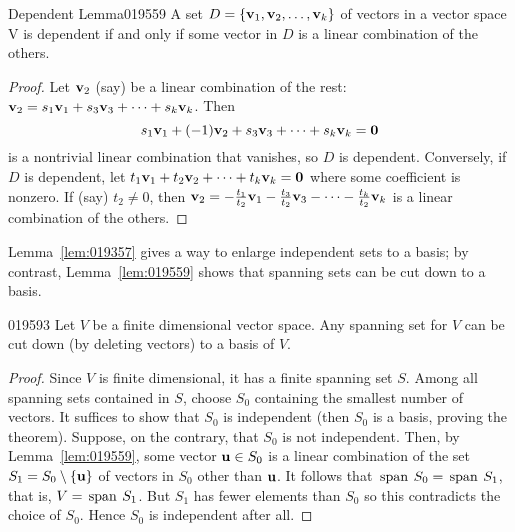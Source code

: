 \begin{lemma}{Dependent Lemma}{019559}
A set $D = \{\textbf{v}_{1}, \textbf{v}_{2}, \dots, \textbf{v}_{k}\}$ of vectors in a vector space V is dependent if and only if some vector in $D$ is a linear combination of the others.
\end{lemma}

\begin{proof}
Let $\textbf{v}_{2}$ (say) be a linear combination of the rest: $\textbf{v}_{2} = s_{1}\textbf{v}_{1} + s_{3}\textbf{v}_{3} + \dots + s_{k}\textbf{v}_{k}$. Then 
\begin{equation*}
s_{1}\textbf{v}_{1} + (-1)\textbf{v}_{2} + s_{3}\textbf{v}_{3} + \dots + s_{k}\textbf{v}_{k} = \textbf{0}
\end{equation*}
 is a nontrivial linear combination that vanishes, so $D$ is dependent. Conversely, if $D$ is dependent, let $t_{1}\textbf{v}_{1} + t_{2}\textbf{v}_{2} + \dots + t_{k}\textbf{v}_{k} = \textbf{0}$ where some coefficient is nonzero. If (say) $t_{2} \neq 0$, then $\textbf{v}_2 = - \tfrac{t_1}{t_2}\textbf{v}_1 - \tfrac{t_3}{t_2}\textbf{v}_3 - \dots - \tfrac{t_k}{t_2}\textbf{v}_k$ is a linear combination of the others.
\end{proof}

Lemma~\ref{lem:019357} gives a way to enlarge independent sets to a basis; by contrast, Lemma~\ref{lem:019559} shows that spanning sets can be cut down to a basis.

\begin{theorem}{}{019593}
Let $V$ be a finite dimensional vector space. Any spanning set for $V$ can be cut down (by deleting vectors) to a basis of $V$.
\end{theorem}

\begin{proof}
Since $V$ is finite dimensional, it has a finite spanning set $S$. Among all spanning sets contained in $S$, choose $S_{0}$ containing the smallest number of vectors. It suffices to show that $S_{0}$ is independent (then $S_{0}$ is a basis, proving the theorem). Suppose, on the contrary, that $S_{0}$ is not independent. Then, by Lemma~\ref{lem:019559}, some vector $\textbf{u} \in S_{0}$ is a linear combination of the set $S_{1} = S_{0} \setminus \{\textbf{u}\}$ of vectors in $S_{0}$ other than $\textbf{u}$. It follows that $\thinspace\operatorname{span\medspace} S_{0} = \thinspace\operatorname{span\medspace} S_{1}$, that is, $V = \thinspace\operatorname{span\medspace} S_{1}$. But $S_{1}$ has fewer elements than $S_{0}$ so this contradicts the choice of $S_{0}$. Hence $S_{0}$ is independent after all.
\end{proof}


